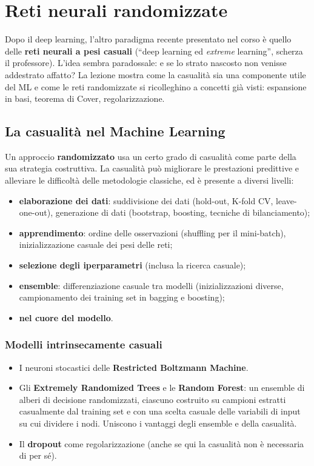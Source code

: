 \chapter{Reti neurali randomizzate}\label{ch-18}

Dopo il deep learning, l'altro paradigma recente presentato nel corso è
quello delle \textbf{reti neurali a pesi casuali} (``deep learning ed
\emph{extreme} learning'', scherza il professore). L'idea sembra
paradossale: e se lo strato nascosto non venisse addestrato affatto? La
lezione mostra come la casualità sia una componente utile del ML e come
le reti randomizzate si ricolleghino a concetti già visti: espansione in
basi, teorema di Cover, regolarizzazione.

\section{La casualità nel Machine
Learning}\label{la-casualituxe0-nel-machine-learning}

Un approccio \textbf{randomizzato} usa un certo grado di casualità come
parte della sua strategia costruttiva. La casualità può migliorare le
prestazioni predittive e alleviare le difficoltà delle metodologie
classiche, ed è presente a diversi livelli:

\begin{itemize}
\tightlist
\item
  \textbf{elaborazione dei dati}: suddivisione dei dati (hold-out,
  K-fold CV, leave-one-out), generazione di dati (bootstrap, boosting,
  tecniche di bilanciamento);
\item
  \textbf{apprendimento}: ordine delle osservazioni (shuffling per il
  mini-batch), inizializzazione casuale dei pesi delle reti;
\item
  \textbf{selezione degli iperparametri} (inclusa la ricerca casuale);
\item
  \textbf{ensemble}: differenziazione casuale tra modelli
  (inizializzazioni diverse, campionamento dei training set in bagging e
  boosting);
\item
  \textbf{nel cuore del modello}.
\end{itemize}

\subsection{Modelli intrinsecamente
casuali}\label{modelli-intrinsecamente-casuali}

\begin{itemize}
\tightlist
\item
  I neuroni stocastici delle \textbf{Restricted Boltzmann Machine}.
\item
  Gli \textbf{Extremely Randomized Trees} e le \textbf{Random Forest}:
  un ensemble di alberi di decisione randomizzati, ciascuno costruito su
  campioni estratti casualmente dal training set e con una scelta
  casuale delle variabili di input su cui dividere i nodi. Uniscono i
  vantaggi degli ensemble e della casualità.
\item
  Il \textbf{dropout} come regolarizzazione (anche se qui la casualità
  non è necessaria di per sé).
\end{itemize}

